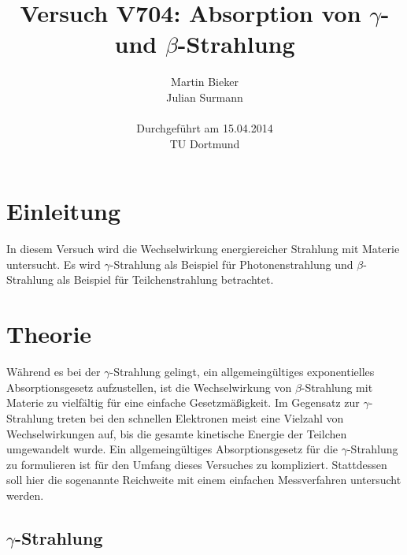 \documentclass[11pt,ngerman,a4paper]{article}
\title{\textbf{Versuch V704: Absorption von $\gamma$- und $\beta$-Strahlung}}
\author{Martin Bieker\\
		Julian Surmann\\
		\\
		Durchgef\"{u}hrt am 15.04.2014\\
		TU Dortmund}
\date{}
\begin{document}
\renewcommand\tablename{Tabelle}
\renewcommand\figurename{Abbildung}
\maketitle
\thispagestyle{empty}
\newpage
\clearpage
\setcounter{page}{1}


\section{Einleitung}
In diesem Versuch wird die Wechselwirkung energiereicher Strahlung mit Materie untersucht. Es wird $\gamma$-Strahlung als Beispiel für Photonenstrahlung und $\beta$-Strahlung als Beispiel für Teilchenstrahlung betrachtet.
\section{Theorie}
Während es bei der $\gamma$-Strahlung gelingt, ein allgemeingültiges exponentielles Absorptionsgesetz aufzustellen, ist die Wechselwirkung von $\beta$-Strahlung mit Materie zu vielfältig für eine einfache Gesetzmäßigkeit. Im Gegensatz zur $\gamma$-Strahlung treten bei den schnellen Elektronen meist eine Vielzahl von Wechselwirkungen auf, bis die gesamte kinetische Energie der Teilchen umgewandelt wurde. Ein allgemeingültiges Absorptionsgesetz für die $\gamma$-Strahlung zu formulieren ist für den Umfang dieses Versuches zu kompliziert. Stattdessen soll hier die sogenannte Reichweite mit einem einfachen Messverfahren untersucht werden.
\subsection{$\gamma$-Strahlung}
\end{document}
